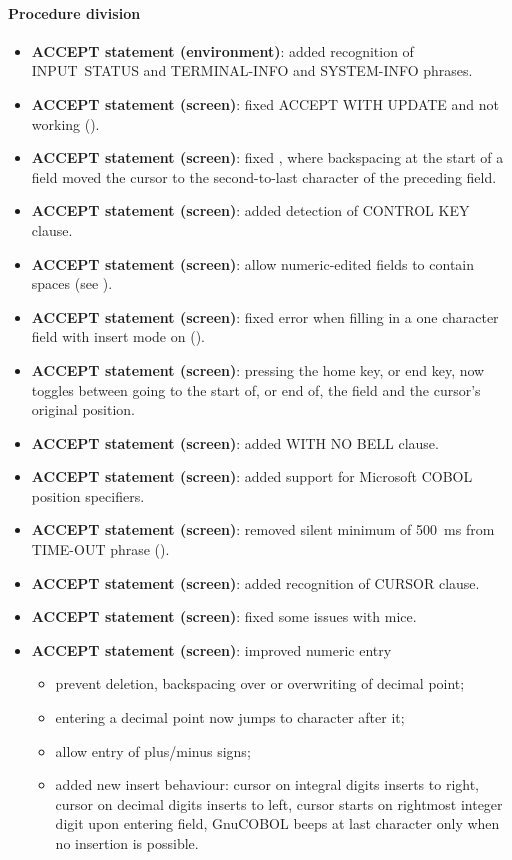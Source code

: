\paragraph{Procedure division}
\begin{itemize}
\item \textbf{ACCEPT statement (environment)}: added recognition of INPUT~STATUS and TERMINAL-INFO and SYSTEM-INFO phrases.
\item \textbf{ACCEPT statement (screen)}: fixed ACCEPT WITH UPDATE and not working ().
\item \textbf{ACCEPT statement (screen)}: fixed , where backspacing at the start of a field moved the cursor to the second-to-last character of the preceding field.
\item \textbf{ACCEPT statement (screen)}: added detection of CONTROL KEY clause.
\item \textbf{ACCEPT statement (screen)}: allow numeric-edited fields to contain spaces (see ).
\item \textbf{ACCEPT statement (screen)}: fixed error when filling in a one character field with insert mode on ().
\item \textbf{ACCEPT statement (screen)}: pressing the home key, or end key, now toggles between going to the start of, or end of, the field and the cursor's original position.
\item \textbf{ACCEPT statement (screen)}: added WITH NO BELL clause.
\item \textbf{ACCEPT statement (screen)}: added support for Microsoft COBOL position specifiers.
\item \textbf{ACCEPT statement (screen)}: removed silent minimum of 500~ms from TIME-OUT phrase ().
\item \textbf{ACCEPT statement (screen)}: added recognition of CURSOR clause.
\item \textbf{ACCEPT statement (screen)}: fixed some issues with mice.
\item \textbf{ACCEPT statement (screen)}: improved numeric entry
  \begin{itemize}
  \item prevent deletion, backspacing over or overwriting of decimal point;
  \item entering a decimal point now jumps to character after it;
  \item allow entry of plus\slash{}minus signs;
  \item added new insert behaviour: cursor on integral digits inserts to right, cursor on decimal digits inserts to left, cursor starts on rightmost integer digit upon entering field, GnuCOBOL beeps at last character only when no insertion is possible.

\end{itemize}
\end{itemize}
